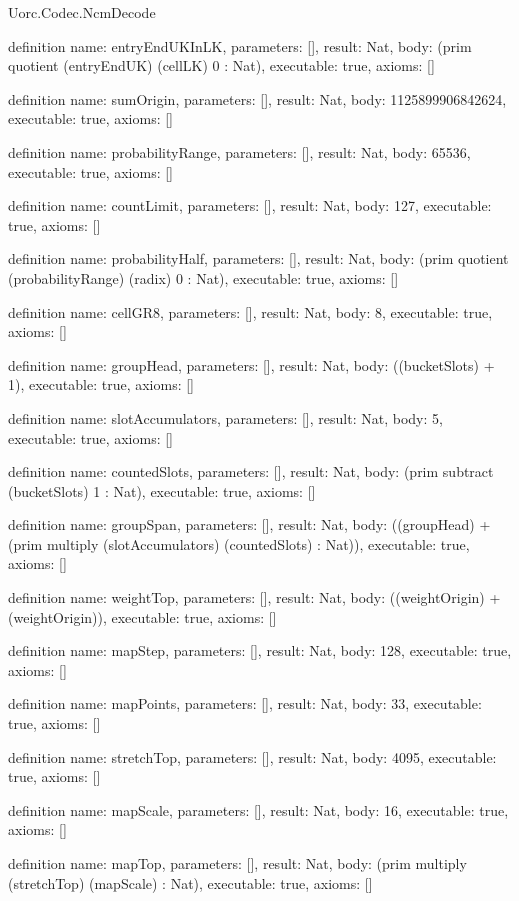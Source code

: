 \begin{lexlean}{Uorc.Codec.NcmDecode}
\begin{semanticmodule}
definition{
  name: entryEndUKInLK,
  parameters: [],
  result: Nat,
  body: (prim quotient (entryEndUK) (cellLK) 0 : Nat),
  executable: true,
  axioms: []
}

definition{
  name: sumOrigin,
  parameters: [],
  result: Nat,
  body: 1125899906842624,
  executable: true,
  axioms: []
}

definition{
  name: probabilityRange,
  parameters: [],
  result: Nat,
  body: 65536,
  executable: true,
  axioms: []
}

definition{
  name: countLimit,
  parameters: [],
  result: Nat,
  body: 127,
  executable: true,
  axioms: []
}

definition{
  name: probabilityHalf,
  parameters: [],
  result: Nat,
  body: (prim quotient (probabilityRange) (radix) 0 : Nat),
  executable: true,
  axioms: []
}

definition{
  name: cellGR8,
  parameters: [],
  result: Nat,
  body: 8,
  executable: true,
  axioms: []
}

definition{
  name: groupHead,
  parameters: [],
  result: Nat,
  body: ((bucketSlots) + 1),
  executable: true,
  axioms: []
}

definition{
  name: slotAccumulators,
  parameters: [],
  result: Nat,
  body: 5,
  executable: true,
  axioms: []
}

definition{
  name: countedSlots,
  parameters: [],
  result: Nat,
  body: (prim subtract (bucketSlots) 1 : Nat),
  executable: true,
  axioms: []
}

definition{
  name: groupSpan,
  parameters: [],
  result: Nat,
  body: ((groupHead) + (prim multiply (slotAccumulators) (countedSlots) : Nat)),
  executable: true,
  axioms: []
}

definition{
  name: weightTop,
  parameters: [],
  result: Nat,
  body: ((weightOrigin) + (weightOrigin)),
  executable: true,
  axioms: []
}

definition{
  name: mapStep,
  parameters: [],
  result: Nat,
  body: 128,
  executable: true,
  axioms: []
}

definition{
  name: mapPoints,
  parameters: [],
  result: Nat,
  body: 33,
  executable: true,
  axioms: []
}

definition{
  name: stretchTop,
  parameters: [],
  result: Nat,
  body: 4095,
  executable: true,
  axioms: []
}

definition{
  name: mapScale,
  parameters: [],
  result: Nat,
  body: 16,
  executable: true,
  axioms: []
}

definition{
  name: mapTop,
  parameters: [],
  result: Nat,
  body: (prim multiply (stretchTop) (mapScale) : Nat),
  executable: true,
  axioms: []
}


\end{semanticmodule}
\end{lexlean}
